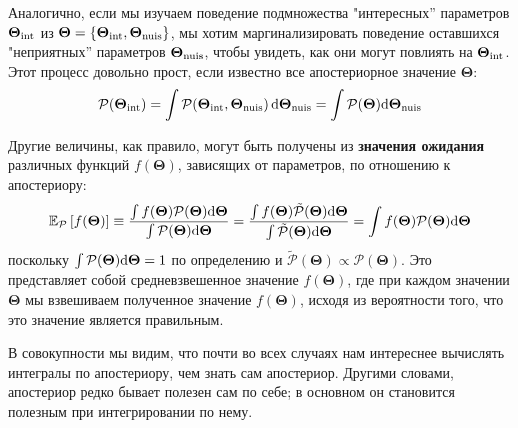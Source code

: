 \documentclass[12pt, titlepage]{article}
\newcommand{\deriv}{\ensuremath{{\rm d}}}  %
\newcommand{\meanwrt}[2]{\ensuremath{\mathbb{E}_{{#2}}\left[{#1}\right]}}
\newcommand{\params}{\ensuremath{\boldsymbol\Theta}}
\newcommand{\posterior}{\ensuremath{\mathcal{P}}}
\begin{document}
Аналогично, если мы изучаем поведение подмножества "интересных'' параметров $\params_{\rm int}$ из $\params = \{ \params_{\rm int}, \params_{\rm nuis} \}$, мы хотим маргинализировать поведение оставшихся "неприятных'' параметров $\params_{\rm nuis}$, чтобы увидеть, как они могут повлиять на $\params_{\rm int}$. Этот процесс довольно прост, если известно все апостериорное значение $\params$:
\begin{equation}
    \posterior(\params_{\rm int})
    = \int \posterior(\params_{\rm int}, \params_{\rm nuis}) \, \deriv \params_{\rm nuis}
    = \int \posterior(\params) \deriv \params_{\rm nuis}
\end{equation}

Другие величины, как правило, могут быть получены из \textbf{значения ожидания} различных функций $f(\params)$, зависящих от параметров, по отношению к апостериору:
\begin{equation}
    \meanwrt{f(\params)}{\posterior} 
    \equiv \frac{\int f(\params) \posterior(\params) \deriv \params}
    {\int \posterior(\params) \deriv \params} 
    = \frac{\int f(\params) \tilde{\posterior}(\params) \deriv \params}
    {\int \tilde{\posterior}(\params) \deriv \params} 
    = \int f(\params) \posterior(\params) \deriv \params
\end{equation}
поскольку $\int \posterior(\params) \deriv \params = 1$ по определению и $\tilde{\posterior}(\params) \propto \posterior(\params)$. Это представляет собой средневзвешенное значение $f(\params)$, где при каждом значении $\params$ мы взвешиваем полученное значение $f(\params)$, исходя из вероятности того, что это значение является правильным.

В совокупности мы видим, что почти во всех случаях нам интереснее вычислять интегралы по апостериору, чем знать сам апостериор. Другими словами, апостериор редко бывает полезен сам по себе; в основном он становится полезным при интегрировании по нему.
\end{document}
